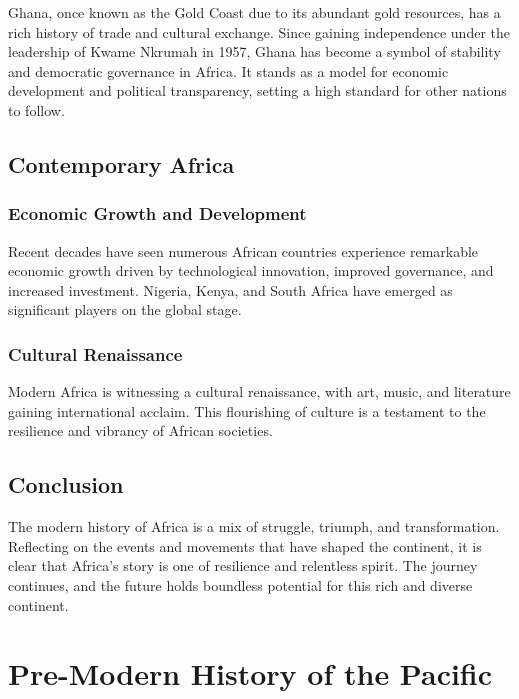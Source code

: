 \documentclass[a4paper,12pt]{book}
\begin{document}
Ghana, once known as the Gold Coast due to its abundant gold resources, has a rich history of trade and cultural exchange. Since gaining independence under the leadership of Kwame Nkrumah in 1957, Ghana has become a symbol of stability and democratic governance in Africa. It stands as a model for economic development and political transparency, setting a high standard for other nations to follow.

\section{Contemporary Africa}
\label{sec:contemporary-africa}

\subsection{Economic Growth and Development}
\label{subsec:economic-growth-and-development}

Recent decades have seen numerous African countries experience remarkable economic growth driven by technological innovation, improved governance, and increased investment. Nigeria, Kenya, and South Africa have emerged as significant players on the global stage.

\subsection{Cultural Renaissance}
\label{subsec:cultural-renaissance}

Modern Africa is witnessing a cultural renaissance, with art, music, and literature gaining international acclaim. This flourishing of culture is a testament to the resilience and vibrancy of African societies.

\section{Conclusion}
\label{sec:conclusion-modern-africa}

The modern history of Africa is a mix of struggle, triumph, and transformation. Reflecting on the events and movements that have shaped the continent, it is clear that Africa’s story is one of resilience and relentless spirit. The journey continues, and the future holds boundless potential for this rich and diverse continent.

\chapter{Pre-Modern History of the Pacific}
\label{ch:pre-modern-pacific-history}
\end{document}
